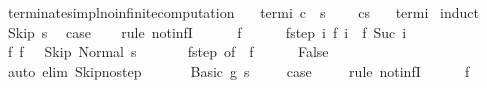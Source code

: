 \begin{isabellebody}
\isamarkupfalse%
\ terminates{\isacharunderscore}impl{\isacharunderscore}no{\isacharunderscore}infinite{\isacharunderscore}computation{\isacharcolon}\isanewline
\ \ \ termi{\isacharcolon}\ {\isachardoublequoteopen}{\isasymGamma}{\isasymturnstile}c\ {\isasymdown}\ s{\isachardoublequoteclose}\isanewline
\ \ \ {\isachardoublequoteopen}{\isasymnot}\ {\isasymGamma}{\isasymturnstile}{\isacharparenleft}c{\isacharcomma}s{\isacharparenright}\ {\isasymrightarrow}\ {\isasymdots}{\isacharparenleft}{\isasyminfinity}{\isacharparenright}{\isachardoublequoteclose}\isanewline
%
\isadelimproof
%
\endisadelimproof
%
\isatagproof
{}\isamarkupfalse%
\ termi\isanewline
{}\isamarkupfalse%
\ {\isacharparenleft}induct{\isacharparenright}\isanewline
\ \ \isamarkupfalse%
\ {\isacharparenleft}Skip\ s{\isacharparenright}\ \isamarkupfalse%
\ {\isacharquery}case\isanewline
\ \ \isamarkupfalse%
\ {\isacharparenleft}rule\ not{\isacharunderscore}infI{\isacharparenright}\isanewline
\ \ \ \ \isamarkupfalse%
\ f\isanewline
\ \ \ \ \isamarkupfalse%
\ f{\isacharunderscore}step{\isacharcolon}\ {\isachardoublequoteopen}{\isasymAnd}i{\isachardot}\ {\isasymGamma}{\isasymturnstile}f\ i\ {\isasymrightarrow}\ f\ {\isacharparenleft}Suc\ i{\isacharparenright}{\isachardoublequoteclose}\isanewline
\ \ \ \ \isamarkupfalse%
\ f{\isacharunderscore}{}{\isacharcolon}\ {\isachardoublequoteopen}f\ {}\ {\isacharequal}\ {\isacharparenleft}Skip{\isacharcomma}\ Normal\ s{\isacharparenright}{\isachardoublequoteclose}\ \isanewline
\ \ \ \ \isamarkupfalse%
\ f{\isacharunderscore}step\ {\isacharbrackleft}of\ {}{\isacharbrackright}\ f{\isacharunderscore}{}\isanewline
\ \ \ \ \isamarkupfalse%
\ False\isanewline
\ \ \ \ \ \ \isamarkupfalse%
\ {\isacharparenleft}auto\ elim{\isacharcolon}\ Skip{\isacharunderscore}no{\isacharunderscore}step{\isacharparenright}\isanewline
\ \ \isamarkupfalse%
\isanewline
{}\isamarkupfalse%
\isanewline
\ \ \isamarkupfalse%
\ {\isacharparenleft}Basic\ g\ s{\isacharparenright}\ \isanewline
\ \ \isamarkupfalse%
\ {\isacharquery}case\ \isanewline
\ \ \isamarkupfalse%
\ {\isacharparenleft}rule\ not{\isacharunderscore}infI{\isacharparenright}\isanewline
\ \ \ \ \isamarkupfalse%
\ f\isanewline
\ \ \ \ \isamarkupfalse%

\end{isabellebody}
